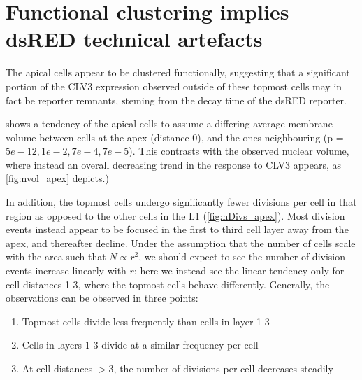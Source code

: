 

 \section{Functional clustering implies dsRED technical artefacts}
 The apical cells appear to be clustered functionally, suggesting that a
 significant portion of the CLV3 expression observed outside of these topmost
 cells may in fact be reporter remnants, steming from the decay time of the
 dsRED reporter. 
 
  shows a tendency of the apical cells to
 assume a differing average membrane volume between cells at the apex (distance
 0), and the
 ones neighbouring (p = $5e-12, 1e-2, 7e-4, 7e-5$). This
 contrasts with the observed nuclear volume, where instead an overall decreasing
 trend in the response to CLV3 appears, as \cref{fig:nvol_apex} depicts.)
 
 In addition, the topmost cells undergo significantly fewer divisions per cell in
 that region as opposed to the other cells in the L1 (\cref{fig:nDivs_apex}).
 Most division events instead appear to be focused in the first to third cell
 layer away from the apex, and thereafter decline. Under the assumption that the
 number of cells scale with the area such that $N \propto r^2$, we should expect
 to see the number of division events increase linearly with $r$; here we
 instead see the linear tendency only for cell distances 1-3, where the topmost cells
 behave differently. Generally, the observations can be observed in three
 points:
 \begin{enumerate}
   \item Topmost cells divide less frequently than cells in layer 1-3
   \item Cells in layers 1-3 divide at a similar frequency per cell
   \item At cell distances $>3$, the number of divisions per cell decreases
     steadily
 \end{enumerate}

